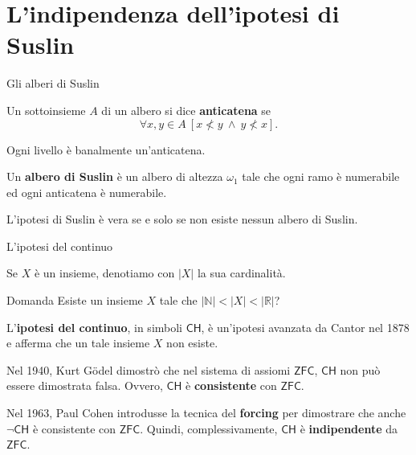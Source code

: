 \documentclass{beamer}
\theoremstyle{num.custom-title}
\theoremstyle{custom-title}
\newcommand{\ZFC}{\ensuremath{\mathsf{ZFC}}\xspace}
\newcommand{\CH}{\ensuremath{\mathsf{CH}}\xspace}
\newcommand{\N}{\mathbb{N}}
\newcommand{\R}{\mathbb{R}}
\renewcommand{\emph}[1]{\textbf{#1}}
\begin{document}
\section{L'indipendenza dell'ipotesi di Suslin}


\begin{frame}{Gli alberi di Suslin}

\begin{definition}
Un sottoinsieme $A$ di un albero si dice \emph{anticatena} se 
\[
\forall x,y \in A \ [x \nless y \ \wedge \ y \nless x].
\]
\end{definition}

Ogni livello è banalmente un'anticatena.

\pause

\begin{definition}
Un \emph{albero di Suslin} è un albero di altezza $\omega_1$ tale che ogni ramo è numerabile ed ogni anticatena è numerabile.
\end{definition}

\pause

\begin{theorem}[Kurepa, 1935]
L'ipotesi di Suslin è vera se e solo se non esiste nessun albero di Suslin.
\end{theorem}

\end{frame}


\begin{frame}{L'ipotesi del continuo}

Se $X$ è un insieme, denotiamo con $|X|$ la sua cardinalità.

\begin{exampleblock}{Domanda}
Esiste un insieme $X$ tale che $|\N| < |X| < |\R|$?
\end{exampleblock}

\pause

L'\emph{ipotesi del continuo}, in simboli \CH, è un'ipotesi avanzata da Cantor nel 1878 e afferma che un tale insieme $X$ non esiste.

\pause

Nel 1940, Kurt Gödel dimostrò che nel sistema di assiomi \ZFC, \CH non può essere dimostrata falsa. Ovvero, \CH è \emph{consistente} con \ZFC.

\pause

Nel 1963, Paul Cohen introdusse la tecnica del \emph{forcing} per dimostrare che anche $\neg\CH$ è consistente con \ZFC. Quindi, complessivamente, \CH è \emph{indipendente} da \ZFC.

\end{frame}
\end{document}
